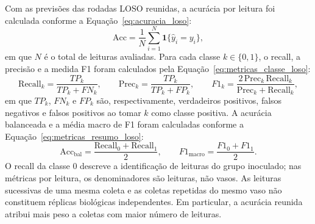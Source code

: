 Com as previsões das rodadas LOSO reunidas, a acurácia por leitura foi
calculada conforme a Equação~\eqref{eq:acuracia_loso}:
\begin{equation}
    \mathrm{Acc}=\frac{1}{N}
    \sum_{i=1}^{N}\mathbf{1}\{\widehat y_i=y_i\},
    \label{eq:acuracia_loso}
\end{equation}
em que $N$ é o total de leituras avaliadas. Para cada classe
$k\in\{0,1\}$, o recall, a precisão e a medida F1 foram calculados
pela Equação~\eqref{eq:metricas_classe_loso}:
\begin{equation}
    \mathrm{Recall}_k=\frac{TP_k}{TP_k+FN_k},\qquad
    \mathrm{Prec}_k=\frac{TP_k}{TP_k+FP_k},\qquad
    F1_k=\frac{2\,\mathrm{Prec}_k\,\mathrm{Recall}_k}
    {\mathrm{Prec}_k+\mathrm{Recall}_k},
    \label{eq:metricas_classe_loso}
\end{equation}
em que $TP_k$, $FN_k$ e $FP_k$ são, respectivamente, verdadeiros positivos,
falsos negativos e falsos positivos ao tomar $k$ como classe positiva.
A acurácia balanceada e a média macro de F1 foram calculadas conforme a
Equação~\eqref{eq:metricas_resumo_loso}:
\begin{equation}
    \mathrm{Acc}_{\mathrm{bal}}=
    \frac{\mathrm{Recall}_0+\mathrm{Recall}_1}{2},
    \qquad
    F1_{\mathrm{macro}}=\frac{F1_0+F1_1}{2}.
    \label{eq:metricas_resumo_loso}
\end{equation}
O recall da classe 0 descreve a identificação de leituras do grupo
inoculado; nas métricas por leitura, os denominadores são leituras, não
vasos. As leituras sucessivas de uma mesma coleta e as coletas repetidas do mesmo
vaso não constituem réplicas biológicas independentes. Em particular,
a acurácia reunida atribui mais peso a coletas com maior número de leituras.

